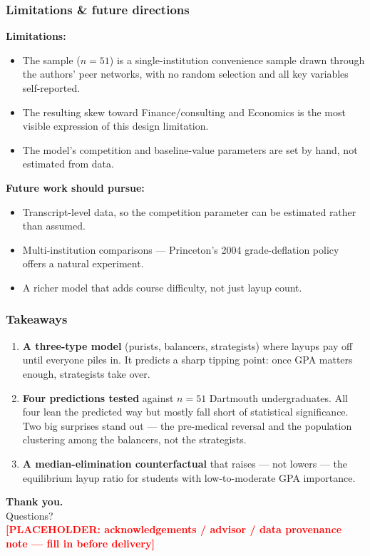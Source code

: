 \documentclass[xcolor=dvipsnames,11pt,table,aspectratio=169]{beamer}
\begin{document}
\begin{frame}
\frametitle{Limitations \& future directions}
\scriptsize
\textbf{Limitations:}
\begin{itemize}
\itemsep1pt
\item The sample ($n = 51$) is a single-institution convenience sample
      drawn through the authors' peer networks, with no random
      selection and all key variables self-reported.
\item The resulting skew toward Finance/consulting and Economics is
      the most visible expression of this design limitation.
\item The model's competition and baseline-value parameters are set by
      hand, not estimated from data.
\end{itemize}
\vskip 4pt
\textbf{Future work should pursue:}
\begin{itemize}
\itemsep1pt
\item Transcript-level data, so the competition parameter can be
      estimated rather than assumed.
\item Multi-institution comparisons --- Princeton's 2004 grade-deflation
      policy offers a natural experiment.
\item A richer model that adds course difficulty, not just layup count.
\end{itemize}
\end{frame}

\begin{frame}
\frametitle{Takeaways}
\small
\begin{enumerate}
\itemsep4pt
\item \textbf{A three-type model} (purists, balancers, strategists)
      where layups pay off until everyone piles in. It predicts a sharp
      tipping point: once GPA matters enough, strategists take over.
\item \textbf{Four predictions tested} against $n = 51$ Dartmouth
      undergraduates. All four lean the predicted way but mostly fall
      short of statistical significance. Two big surprises stand out ---
      the pre-medical reversal and the population clustering among the
      balancers, not the strategists.
\item \textbf{A median-elimination counterfactual} that raises ---
      not lowers --- the equilibrium layup ratio for students with
      low-to-moderate GPA importance.
\end{enumerate}
\end{frame}

\begin{frame}
\begin{center}
\vskip 1cm
{\Large \textbf{\textcolor{DartmouthGreen}{Thank you.}}}\\[14pt]
\normalsize Questions?\\[18pt]
\textcolor{red}{\textbf{[PLACEHOLDER: acknowledgements / advisor / data
provenance note — fill in before delivery]}}
\end{center}
\end{frame}
\end{document}
